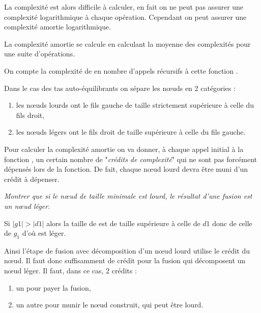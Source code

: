 \medskip

La complexité est alors difficile à calculer, en fait on ne peut pas assurer une complexité logarithmique à chaque opération. Cependant on peut assurer une complexité amortie logarithmique.

La complexité amortie se calcule en calculant la moyenne des complexités pour une suite d'opérations.

On compte la complexité de  en nombre d'appels récursifs à cette fonction .

Dans le cas des tas auto-équilibrants on sépare les nœuds en 2 catégories :
\begin{enumerate}
    \item les nœuds lourds ont le fils gauche de taille strictement supérieure à celle du fils droit,
    \item les nœuds légers ont le fils droit de taille supérieure à celle du fils gauche.
\end{enumerate}
Pour calculer la complexité amortie on va donner, à chaque appel initial à la fonction , un certain nombre de "{\it crédits de complexité}" qui ne sont pas forcément dépensés lors de la fonction. De fait, chaque nœud lourd devra être muni d'un crédit à dépenser.
\begin{Exercise}[title = Cas des nœuds lourds]\it 
Montrer que si le nœud de taille minimale est lourd, le résultat d'une fusion est un nœud léger.
\end{Exercise}
\begin{Answer}
Si $|g1| > |d1|$ alors la taille de  est de taille supérieure à celle de $d1$ donc de celle de $g_1$ d'où  est léger.
\end{Answer}
\medskip

Ainsi l'étape de fusion avec décomposition d'un nœud lourd utilise le crédit du nœud. Il faut donc suffisamment de crédit pour la fusion qui décomposent un nœud léger. Il faut, dans ce cas, 2 crédits :
\begin{enumerate}
    \item un pour payer la fusion,
    \item un autre pour munir le nœud construit, qui peut être lourd.
\end{enumerate}

